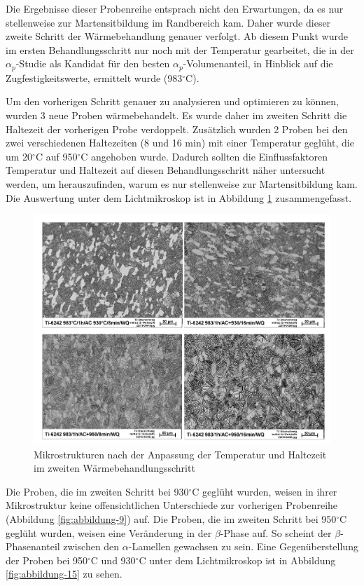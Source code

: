 Die Ergebnisse dieser Probenreihe entsprach nicht den Erwartungen, da es nur stellenweise zur Martensitbildung im Randbereich kam. Daher wurde dieser zweite Schritt der Wärmebehandlung genauer verfolgt. Ab diesem Punkt wurde im ersten Behandlungsschritt nur noch mit der Temperatur gearbeitet, die in der $\alpha_p$-Studie als Kandidat für den besten $\alpha_p$-Volumenanteil, in Hinblick auf die Zugfestigkeitswerte, ermittelt wurde (983$^\circ$C). 

Um den vorherigen Schritt genauer zu analysieren und optimieren zu können, wurden 3 neue Proben wärmebehandelt. Es wurde daher im zweiten Schritt die Haltezeit der vorherigen Probe verdoppelt. Zusätzlich wurden 2 Proben bei den zwei verschiedenen Haltezeiten (8 und 16 min) mit einer Temperatur geglüht, die um 20$^\circ$C auf 950$^\circ$C angehoben wurde. Dadurch sollten die Einflussfaktoren Temperatur und Haltezeit auf diesen Behandlungsschritt näher untersucht werden, um herauszufinden, warum es nur stellenweise zur Martensitbildung kam. Die Auswertung unter dem Lichtmikroskop ist in Abbildung \ref{fig:abbildung-14} zusammengefasst. 

\begin{figure}[h]
	\centering
	\includegraphics[width=0.9\linewidth]{./Bilder/Abbildung 14.png}
	\caption[Abbildung 14]{Mikrostrukturen nach der Anpassung der Temperatur und Haltezeit im zweiten Wärmebehandlungsschritt}
	\label{fig:abbildung-14}
\end{figure}

Die Proben, die im zweiten Schritt bei 930$^\circ$C geglüht wurden, weisen in ihrer Mikrostruktur keine offensichtlichen Unterschiede zur vorherigen Probenreihe (Abbildung \ref{fig:abbildung-9}) auf. Die Proben, die im zweiten Schritt bei 950$^\circ$C geglüht wurden, weisen eine Veränderung in der $\beta$-Phase auf. So scheint der $\beta$-Phasenanteil zwischen den $\alpha$-Lamellen gewachsen zu sein. Eine Gegenüberstellung der Proben bei 950$^\circ$C und 930$^\circ$C unter dem Lichtmikroskop ist in Abbildung \ref{fig:abbildung-15} zu sehen.

